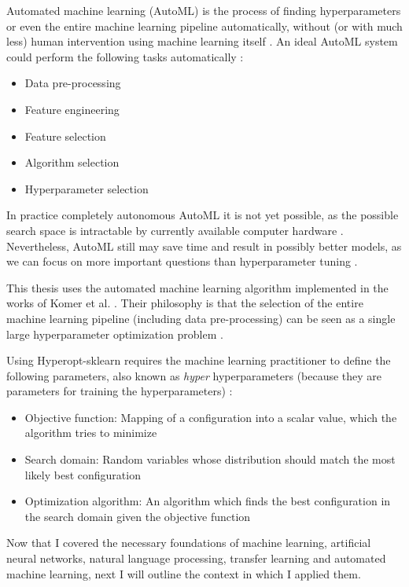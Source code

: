 \documentclass[draft,final,oneside]{vutinfth} %
\begin{document}
Automated machine learning (AutoML) is the process of finding hyperparameters or even the entire machine learning pipeline automatically, without (or with much less) human intervention using machine learning itself \cite{hyperoptpaper}. An ideal AutoML system could perform the following tasks automatically \cite{automlsurvey}:

\begin{itemize}
\item Data pre-processing
\item Feature engineering
\item Feature selection
\item Algorithm selection
\item Hyperparameter selection
\end{itemize}

In practice completely autonomous AutoML it is not yet possible, as the possible search space is intractable by currently available computer hardware \cite{automlsurvey}. Nevertheless, AutoML still may save time and result in possibly better models, as we can focus on more important questions than hyperparameter tuning \cite{automlsurvey}.

This thesis uses the automated machine learning algorithm implemented in the works of Komer et al. \cite{hyperoptpaper}. Their philosophy is that the selection of the entire machine learning pipeline (including data pre-processing) can be seen as a single large hyperparameter optimization problem \cite{hyperoptpaper}.

Using Hyperopt-sklearn requires the machine learning practitioner to define the following parameters, also known as \textit{hyper} hyperparameters (because they are parameters for training the hyperparameters) \cite{hyperoptpaper}:
\begin{itemize}
\item Objective function: Mapping of a configuration into a scalar value, which the algorithm tries to minimize \cite{hyperoptpaper}
\item Search domain: Random variables whose distribution should match the most likely best configuration \cite{hyperoptpaper}
\item Optimization algorithm: An algorithm which finds the best configuration in the search domain given the objective function \cite{hyperoptpaper}
\end{itemize}

Now that I covered the necessary foundations of machine learning, artificial neural networks, natural language processing, transfer learning and automated machine learning, next I will outline the context in which I applied them.
\end{document}
